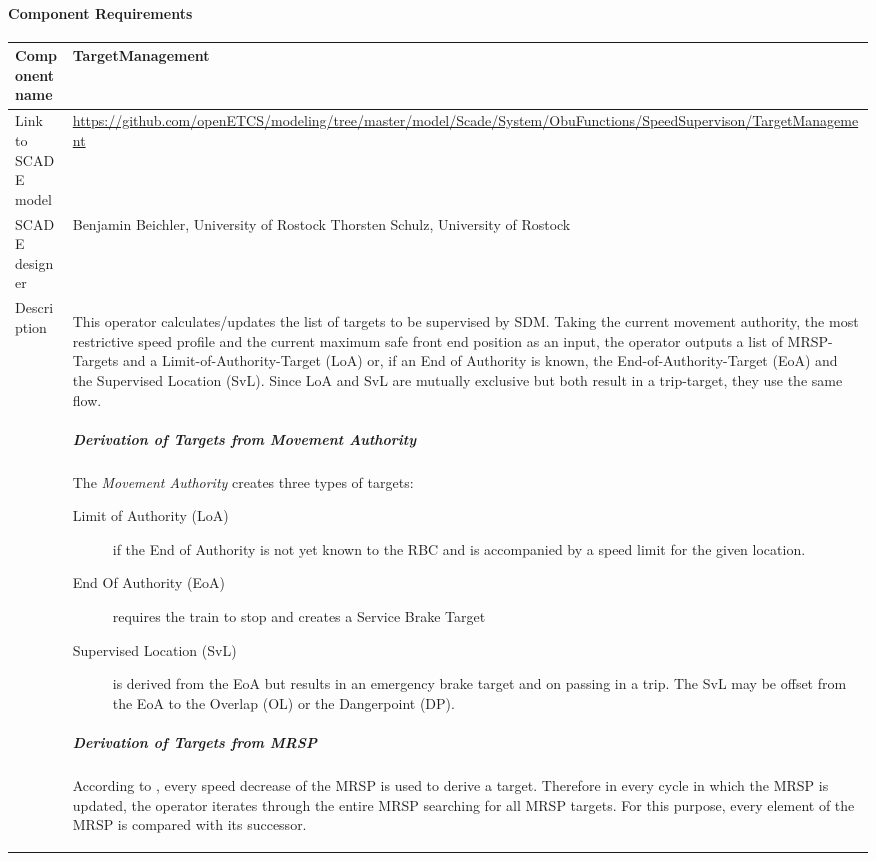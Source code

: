 
\paragraph{Component Requirements}

\begin{longtable}{p{}p{}}
\toprule
Component name			& TargetManagement \\
\midrule
Link to SCADE model		& {\footnotesize \url{https://github.com/openETCS/modeling/tree/master/model/Scade/System/ObuFunctions/SpeedSupervison/TargetManagement}} \\
\midrule
SCADE designer			&  Benjamin Beichler, University of Rostock\newline
Thorsten Schulz, University of Rostock \\
\midrule
Description				& This operator calculates/updates the list of targets to be supervised by SDM. Taking the current movement authority, the most restrictive speed profile and the current maximum safe front end position as an input, the operator outputs a list of MRSP-Targets and a Limit-of-Authority-Target (LoA) or, if an End of Authority is known, the End-of-Authority-Target (EoA) and the Supervised Location (SvL). Since LoA and SvL are mutually exclusive but both result in a trip-target, they use the same flow.

\subparagraph*{Derivation of Targets from Movement Authority}
The \emph{Movement Authority} creates three types of targets:
\begin{description}
\item[Limit of Authority (LoA)] if the End of Authority is not yet known to the RBC and is accompanied by a speed limit for the given location.
\item[End Of Authority (EoA)] requires the train to stop and creates a Service Brake Target
\item[Supervised Location (SvL)] is derived from the EoA but results in an emergency brake target and on passing in a trip. The SvL may be offset from the EoA to the Overlap (OL) or the Dangerpoint (DP).
\end{description}

\subparagraph*{Derivation of Targets from MRSP}
According to \cite[Chapt.~3.13.8.2]{subset-026}, every speed decrease of the MRSP is used to derive a target. Therefore in every cycle in which the MRSP is updated, the operator iterates through the entire MRSP searching for all MRSP targets. For this purpose, every element of the MRSP is compared with its successor.


\end{longtable}
